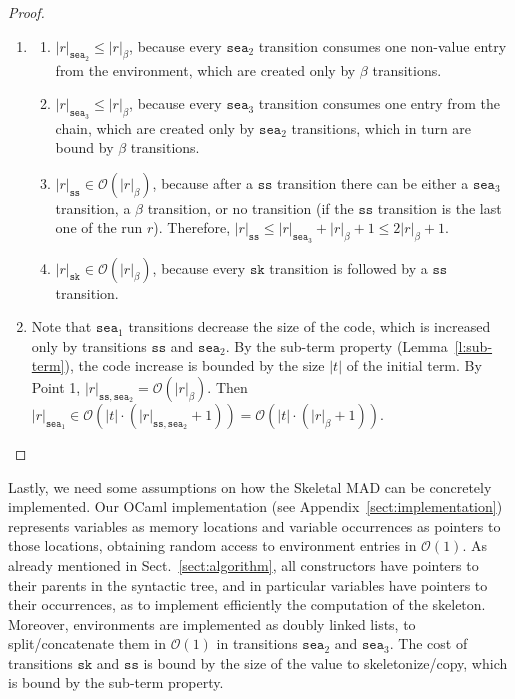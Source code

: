 \documentclass[10pt,a4paper]{article}
\theoremstyle{remark}
\newcommand{\tm}{t}
\newcommand{\symfont}[1]{\mathtt{#1}}
\newcommand{\sksym}{\symfont{sk}}
\newcommand{\reflemma}[1]{Lemma~\ref{l:#1}}
\newcommand{\refsect}[1]{Sect.~\ref{sect:#1}}
\newcommand{\refapp}[1]{Appendix~\ref{sect:#1}}
\newcommand{\size}[1]{|#1|}
\newcommand{\sizep}[2]{|#1|_{#2}}
\newcommand{\seasym}{\symfont{sea}}
\newcommand{\bigo}{{\mathcal{O}}}
\newcommand{\sssym}{\symfont{ss}}
\newcommand{\run}{r}
\begin{document}
\begin{proof}

\hfill
\begin{enumerate}
\item
\begin{enumerate}
\item $\sizep\run{\seasym_2} \leq \sizep\run\beta$, because every $\seasym_2$ transition consumes one non-value entry from the environment, which are created only by $\beta$ transitions.

\item $\sizep\run{\seasym_3} \le \sizep\run\beta$, because every $\seasym_3$ transition consumes one entry from the chain, which are created only by $\seasym_2$ transitions, which in turn are bound by $\beta$ transitions.

\item $\sizep\run{\sssym} \in \bigo(\sizep\run\beta)$, because
after a $\sssym$ transition there can be either a $\seasym_3$ transition, a $\beta$ transition, or no transition (if the $\sssym$ transition is the last one of the run $\run$). Therefore, $\sizep\run{\sssym} \leq \sizep\run{\seasym_3} + \sizep\run\beta +1 \leq 2\sizep\run\beta +1$.

\item $\sizep\run\sksym \in \bigo(\sizep\run\beta)$, because every $\sksym$ transition is followed by a $\sssym$ transition.
\end{enumerate}

\item Note that $\seasym_1$ transitions decrease the size of the code, which is increased only by transitions $\sssym$ and $\seasym_2$. By the sub-term property (\reflemma{sub-term}), the code increase is bounded by the size $\size\tm$ of the initial term. By Point 1, $\sizep\run{\sssym,\seasym_2} =\bigo(\sizep\run\beta)$. Then $\sizep\run{\seasym_1} \in \bigo(\size{\tm}\cdot(\sizep\run{\sssym,\seasym_2} +1))=\bigo(\size{\tm}\cdot(\sizep\run\beta +1))$.\qedhere
\end{enumerate}
\end{proof}

Lastly, we need some assumptions on how the Skeletal MAD can be concretely implemented. Our OCaml implementation (see \refapp{implementation}) represents variables as memory locations and variable occurrences as pointers to those locations, obtaining random access to environment entries in $\bigo(1)$. As already mentioned in \refsect{algorithm}, all constructors have pointers to their parents in the syntactic tree, and in particular variables  have pointers to their occurrences, as to implement efficiently the computation of the skeleton. Moreover, environments are implemented as doubly linked lists, to split/concatenate them in $\bigo(1)$ in transitions $\seasym_2$ and $\seasym_3$. The cost of transitions $\sksym$ and $\sssym$ is bound by the size of the value to skeletonize/copy, which is bound by the sub-term property.
\end{document}
